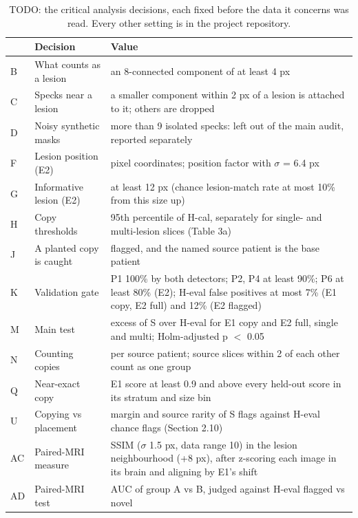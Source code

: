 \begin{table}
\centering
\footnotesize
\begin{tabular}{lp{3.6cm}p{9.6cm}}
\toprule
 & Decision & Value \\
\midrule
B & What counts as a lesion & an 8-connected component of at least 4 px \\
C & Specks near a lesion & a smaller component within 2 px of a lesion is attached to it; others are dropped \\
D & Noisy synthetic masks & more than 9 isolated specks: left out of the main audit, reported separately \\
F & Lesion position (E2) & pixel coordinates; position factor with $\sigma$ = 6.4 px \\
G & Informative lesion (E2) & at least 12 px (chance lesion-match rate at most 10\% from this size up) \\
H & Copy thresholds & 95th percentile of H-cal, separately for single- and multi-lesion slices (Table 3a) \\
J & A planted copy is caught & flagged, and the named source patient is the base patient \\
K & Validation gate & P1 100\% by both detectors; P2, P4 at least 90\%; P6 at least 80\% (E2); H-eval false positives at most 7\% (E1 copy, E2 full) and 12\% (E2 flagged) \\
M & Main test & excess of S over H-eval for E1 copy and E2 full, single and multi; Holm-adjusted p $<$ 0.05 \\
N & Counting copies & per source patient; source slices within 2 of each other count as one group \\
Q & Near-exact copy & E1 score at least 0.9 and above every held-out score in its stratum and size bin \\
U & Copying vs placement & margin and source rarity of S flags against H-eval chance flags (Section 2.10) \\
AC & Paired-MRI measure & SSIM ($\sigma$ 1.5 px, data range 10) in the lesion neighbourhood (+8 px), after z-scoring each image in its brain and aligning by E1's shift \\
AD & Paired-MRI test & AUC of group A vs B, judged against H-eval flagged vs novel \\
\bottomrule
\end{tabular}
\caption{TODO: the critical analysis decisions, each fixed before the data it concerns was read. Every other setting is in the project repository.}
\label{tab:decisions}
\end{table}
